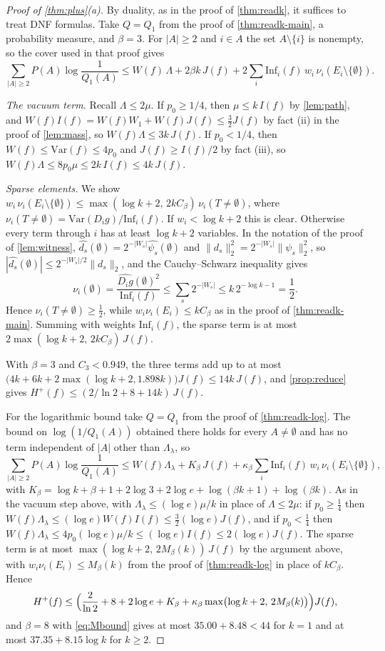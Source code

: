 \documentclass[11pt]{amsart}
\theoremstyle{definition}
\theoremstyle{remark}
\newcommand{\Inf}{\mathrm{Inf}}
\newcommand{\Var}{\mathrm{Var}}
\begin{document}
\begin{proof}[Proof of \cref{thm:plus}\textup{(a)}]
By duality, as in the proof of \cref{thm:readk}, it suffices to treat DNF formulas. Take $Q=Q_1$ from the proof of
\cref{thm:readk-main}, a probability measure, and $\beta=3$. For $|A|\ge2$ and $i\in A$ the set $A\setminus\{i\}$
is nonempty, so the cover used in that proof gives
\[
\sum_{|A|\ge2}P(A)\log\frac1{Q_1(A)}\le W(f)\,\Lambda+2\beta k\,J(f)+2\sum_i\Inf_i(f)\,w_i\,\nu_i(E_i\setminus\{\emptyset\}).
\]

\emph{The vacuum term.} Recall $\Lambda\le2\mu$. If $p_0\ge1/4$, then $\mu\le k\,I(f)$ by \cref{lem:path}, and
$W(f)I(f)=W(f)W_1+W(f)J(f)\le\frac32J(f)$ by fact (ii) in the proof of \cref{lem:mass}, so $W(f)\Lambda\le3k\,J(f)$.
If $p_0<1/4$, then $W(f)\le\Var(f)\le4p_0$ and $J(f)\ge I(f)/2$ by fact (iii), so
$W(f)\Lambda\le8p_0\mu\le2k\,I(f)\le4k\,J(f)$.

\emph{Sparse elements.} We show $w_i\,\nu_i(E_i\setminus\{\emptyset\})\le\max(\log k+2,\,2kC_\beta)\,\nu_i(T\ne\emptyset)$,
where $\nu_i(T\ne\emptyset)=\Var(D_ig)/\Inf_i(f)$. If $w_i<\log k+2$ this is clear. Otherwise every term through $i$
has at least $\log k+2$ variables. In the notation of the proof of \cref{lem:witness},
$\widehat{d_s}(\emptyset)=2^{-|W_s|}\widehat{\psi_s}(\emptyset)$ and $\|d_s\|_2^2=2^{-|W_s|}\|\psi_s\|_2^2$, so
$|\widehat{d_s}(\emptyset)|\le2^{-|W_s|/2}\|d_s\|_2$, and the Cauchy--Schwarz inequality gives
\[
\nu_i(\emptyset)=\frac{\widehat{D_ig}(\emptyset)^2}{\Inf_i(f)}\le\sum_s2^{-|W_s|}\le k\,2^{-\log k-1}=\frac12 .
\]
Hence $\nu_i(T\ne\emptyset)\ge\frac12$, while $w_i\nu_i(E_i)\le kC_\beta$ as in the proof of \cref{thm:readk-main}.
Summing with weights $\Inf_i(f)$, the sparse term is at most $2\max(\log k+2,\,2kC_\beta)\,J(f)$.

With $\beta=3$ and $C_3<0.949$, the three terms add up to at most $\bigl(4k+6k+2\max(\log k+2,1.898k)\bigr)J(f)\le14k\,J(f)$,
and \cref{prop:reduce} gives $H^+(f)\le(2/\ln2+8+14k)\,J(f)$.

For the logarithmic bound take $Q=Q_1$ from the proof of \cref{thm:readk-log}. The bound on $\log(1/Q_1(A))$ obtained
there holds for every $A\ne\emptyset$ and has no term independent of $|A|$ other than $\Lambda_\lambda$, so
\[
\sum_{|A|\ge2}P(A)\log\frac1{Q_1(A)}\le W(f)\Lambda_\lambda+K_\beta\,J(f)+\kappa_\beta\sum_i\Inf_i(f)\,w_i\,\nu_i(E_i\setminus\{\emptyset\}),
\]
with $K_\beta=\log k+\beta+1+2\log3+2\log e+\log(\beta k+1)+\log(\beta k)$. As in the vacuum step above, with
$\Lambda_\lambda\le(\log e)\mu/k$ in place of $\Lambda\le2\mu$: if $p_0\ge\frac14$ then $W(f)\Lambda_\lambda\le(\log e)
W(f)I(f)\le\frac32(\log e)J(f)$, and if $p_0<\frac14$ then $W(f)\Lambda_\lambda\le4p_0(\log e)\mu/k\le(\log e)I(f)\le
2(\log e)J(f)$. The sparse term is at most $\max(\log k+2,\,2M_\beta(k))\,J(f)$ by the argument above, with
$w_i\nu_i(E_i)\le M_\beta(k)$ from the proof of \cref{thm:readk-log} in place of $kC_\beta$. Hence
\[
H^+(f)\le\Bigl(\frac2{\ln2}+8+2\log e+K_\beta+\kappa_\beta\max\bigl(\log k+2,\,2M_\beta(k)\bigr)\Bigr)J(f),
\]
and $\beta=8$ with \eqref{eq:Mbound} gives at most $35.00+8.48<44$ for $k=1$ and at most
$37.35+8.15\log k$ for $k\ge2$.
\end{proof}
\end{document}
